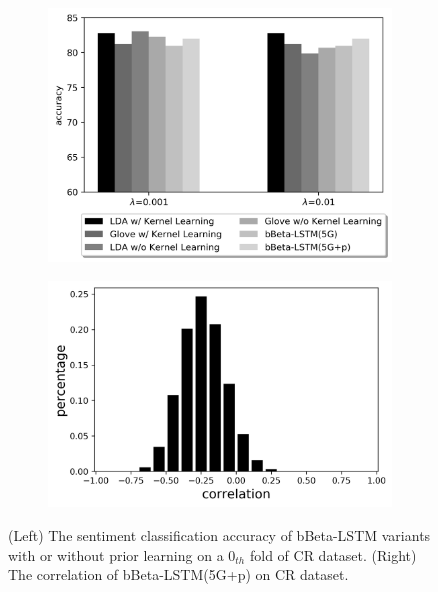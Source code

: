 \documentclass[letterpaper]{article} %
\begin{document}
\begin{figure}
	\centering
	\begin{subfigure}[]{0.48\columnwidth}
		\includegraphics[width=\linewidth]{accuracy_cr0_LDA_glove.png}
	\end{subfigure}
	\begin{subfigure}[]{0.48\columnwidth}
		\includegraphics[width=\linewidth]{cr_tr_GBetalstm_corr.png}	
	\end{subfigure}
	\caption{(Left) The sentiment classification accuracy of bBeta-LSTM variants with or without prior learning on a $0_{th}$ fold of CR dataset. (Right) The correlation of bBeta-LSTM(5G+p) on CR dataset.}
	\label{fig:prior_learning_corr_cr_mr}
\end{figure}
\end{document}
